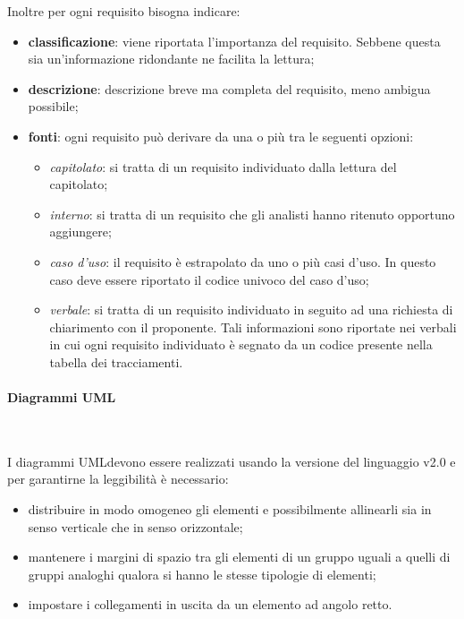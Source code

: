 \noindent
Inoltre per ogni requisito bisogna indicare:	
	\begin{itemize}		
		\item \textbf{classificazione}: viene riportata l'importanza del requisito. 
			Sebbene questa sia un'informazione ridondante ne facilita la lettura;
		\item \textbf{descrizione}: descrizione breve ma completa del requisito, 
			meno ambigua possibile;
		\item \textbf{fonti}: ogni requisito può derivare da una o più tra le 
		seguenti opzioni:
		\begin{itemize}
			\item \textit{capitolato\glo}: si tratta di un requisito individuato dalla 
				lettura del capitolato\glo;
			\item \textit{interno}: si tratta di un requisito che gli analisti hanno 
				ritenuto opportuno aggiungere;
			\item \textit{caso d'uso}: il requisito è estrapolato da uno o più casi 
				d'uso. In questo caso deve essere riportato il codice univoco del caso d'uso;
			\item \textit{verbale}: si tratta di un requisito individuato in seguito ad 
				una richiesta di chiarimento con il proponente. Tali informazioni sono riportate 
				nei verbali in cui ogni requisito individuato è segnato da un codice presente 
				nella tabella dei tracciamenti. \\
		\end{itemize}
	\end{itemize}

\paragraph*{Diagrammi UML} \mbox{}\\ \label{sec:UML}

\noindent I diagrammi UML\glosp devono essere realizzati usando la versione del 
linguaggio v2.0 e per garantirne la leggibilità è necessario:
	\begin{itemize}
		\item distribuire in modo omogeneo gli elementi e possibilmente allinearli 
			sia in senso verticale che in senso orizzontale;
		\item mantenere i margini di spazio tra gli elementi di un gruppo uguali a 
			quelli di gruppi analoghi qualora si hanno le stesse tipologie di elementi;
		\item impostare i collegamenti in uscita da un elemento ad angolo retto. 
	\end{itemize}

